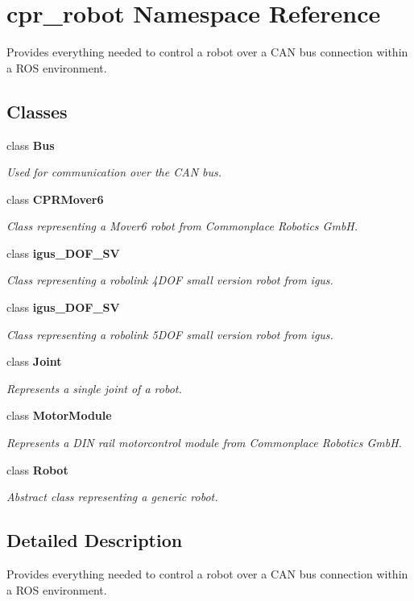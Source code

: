 \section{cpr\+\_\+robot Namespace Reference}
\label{namespacecpr__robot}


Provides everything needed to control a robot over a C\+AN bus connection within a R\+OS environment.  


\subsection*{Classes}
\begin{DoxyCompactItemize}
\item 
class \textbf{ Bus}
\begin{DoxyCompactList}\small\item\em Used for communication over the C\+AN bus. \end{DoxyCompactList}\item 
class \textbf{ C\+P\+R\+Mover6}
\begin{DoxyCompactList}\small\item\em Class representing a Mover6 robot from Commonplace Robotics GmbH. \end{DoxyCompactList}\item 
class \textbf{ igus\+\_\+D\+O\+F\+\_\+\+SV}
\begin{DoxyCompactList}\small\item\em Class representing a robolink 4\+D\+OF small version robot from igus. \end{DoxyCompactList}\item 
class \textbf{ igus\+\_\+D\+O\+F\+\_\+\+SV}
\begin{DoxyCompactList}\small\item\em Class representing a robolink 5\+D\+OF small version robot from igus. \end{DoxyCompactList}\item 
class \textbf{ Joint}
\begin{DoxyCompactList}\small\item\em Represents a single joint of a robot. \end{DoxyCompactList}\item 
class \textbf{ Motor\+Module}
\begin{DoxyCompactList}\small\item\em Represents a D\+IN rail motorcontrol module from Commonplace Robotics GmbH. \end{DoxyCompactList}\item 
class \textbf{ Robot}
\begin{DoxyCompactList}\small\item\em Abstract class representing a generic robot. \end{DoxyCompactList}\end{DoxyCompactItemize}


\subsection{Detailed Description}
Provides everything needed to control a robot over a C\+AN bus connection within a R\+OS environment. 